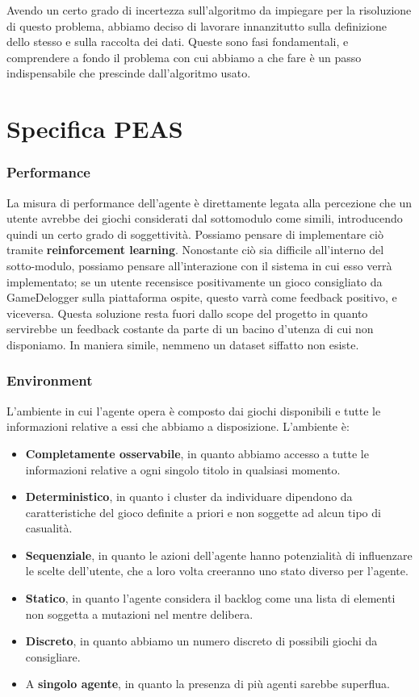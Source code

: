 Avendo un certo grado di incertezza sull'algoritmo da impiegare per la risoluzione di questo problema, abbiamo deciso di lavorare innanzitutto sulla definizione dello stesso e sulla raccolta dei dati. Queste sono fasi fondamentali, e comprendere a fondo il problema con cui abbiamo a che fare è un passo indispensabile che prescinde dall'algoritmo usato.

\section{Specifica PEAS}
    \subsubsection{Performance}
        La misura di performance dell'agente è direttamente legata alla percezione che un utente avrebbe dei giochi considerati dal sottomodulo come simili, introducendo quindi un certo grado di soggettività. Possiamo pensare di implementare ciò tramite \textbf{reinforcement learning}. Nonostante ciò sia difficile all'interno del sotto-modulo, possiamo pensare all'interazione con il sistema in cui esso verrà implementato; se un utente recensisce positivamente un gioco consigliato da GameDelogger sulla piattaforma ospite, questo varrà come feedback positivo, e viceversa. Questa soluzione resta fuori dallo scope del progetto in quanto servirebbe un feedback costante da parte di un bacino d'utenza di cui non disponiamo. In maniera simile, nemmeno un dataset siffatto non esiste.
        
    \subsubsection{Environment}
        L'ambiente in cui l'agente opera è composto dai giochi disponibili e tutte le informazioni relative a essi che abbiamo a disposizione. L'ambiente è:
        \begin{itemize}
            \item \textbf{Completamente osservabile}, in quanto abbiamo accesso a tutte le informazioni relative a ogni singolo titolo in qualsiasi momento.
            \item \textbf{Deterministico}, in quanto i cluster da individuare dipendono da caratteristiche del gioco definite a priori e non soggette ad alcun tipo di casualità.
            \item \textbf{Sequenziale}, in quanto le azioni dell'agente hanno potenzialità di influenzare le scelte dell'utente, che a loro volta creeranno uno stato diverso per l'agente.
            \item \textbf{Statico}, in quanto l'agente considera il backlog come una lista di elementi non soggetta a mutazioni nel mentre delibera.
            \item \textbf{Discreto}, in quanto abbiamo un numero discreto di possibili giochi da consigliare.
            \item A \textbf{singolo agente}, in quanto la presenza di più agenti sarebbe superflua.
        \end{itemize}
        
